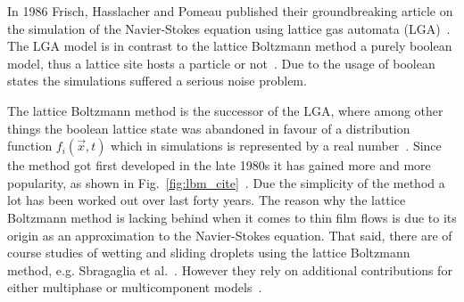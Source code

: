 In 1986 Frisch, Hasslacher and Pomeau published their groundbreaking article on the simulation of the Navier-Stokes equation using lattice gas automata (LGA)~\cite{frischLatticeGasAutomataNavierStokes1986}.
The LGA model is in contrast to the lattice Boltzmann method a purely boolean model, thus a lattice site hosts a particle or not~\cite{mcnamaraUseBoltzmannEquation1988}.
Due to the usage of boolean states the simulations suffered a serious noise problem.

The lattice Boltzmann method is the successor of the LGA, where among other things the boolean lattice state was abandoned in favour of a distribution function $f_{i}(\vec{x}, t)$ which in simulations is represented by a real number~\cite{chenLatticeBoltzmannMethod1998}. 
Since the method got first developed in the late 1980s it has gained more and more popularity, as shown in Fig.~\ref{fig:lbm_cite}~\cite{liLatticeBoltzmannMethod2020}.
Due the simplicity of the method a lot has been worked out over last forty years.
The reason why the lattice Boltzmann method is lacking behind when it comes to thin film flows is due to its origin as an approximation to the Navier-Stokes equation.
That said, there are of course studies of wetting and sliding droplets using the lattice Boltzmann method, e.g. Sbragaglia et al.~\cite{sbragagliaSlidingDropsAlternating2014}.
However they rely on additional contributions for either multiphase or multicomponent models~\cite{shanLatticeBoltzmannModel1993, chenLatticeMethodsTheir1995, shanKineticTheoryRepresentation2006}.

